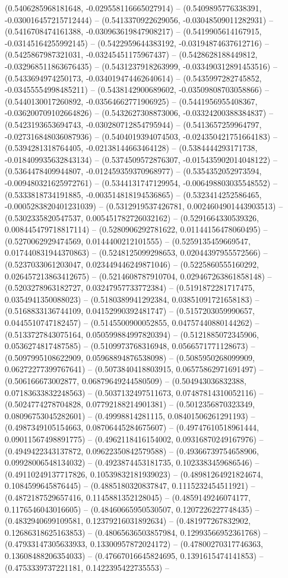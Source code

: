 (0.5406285968181648, -0.029558116665027914) -- (0.5409895776338391, -0.030016457215712444) -- (0.5413370922629056, -0.03048509011282931) -- (0.5416708474161388, -0.030963619847908217) -- (0.5419905614167915, -0.03145164255992145) -- (0.5422959644383192, -0.03194874637612716) -- (0.5425867987321031, -0.03245451175967437) -- (0.5428628188449812, -0.032968511863676435) -- (0.5431237918263999, -0.033490312891453516) -- (0.5433694974250173, -0.034019474462640614) -- (0.5435997282745852, -0.03455554998485211) -- (0.5438142900689602, -0.03509808703058866) -- (0.5440130017260892, -0.03564662771906925) -- (0.5441956955408367, -0.036200709102664826) -- (0.5432627308873006, -0.03324200388384837) -- (0.5423193653694743, -0.030280712854795944) -- (0.5413657259964797, -0.027316848036087936) -- (0.5404019394074503, -0.024350421751664183) -- (0.5394281318764405, -0.02138144663464128) -- (0.5384444293171738, -0.018409935632843134) -- (0.5374509572876307, -0.015435902014048122) -- (0.5364478409944807, -0.012459359370968977) -- (0.5354352052973594, -0.009480321625972761) -- (0.5344131747129954, -0.006498803035548552) -- (0.5333818734191885, -0.003514818194536865) -- (0.5323414252586465, -0.0005283820401231039) -- (0.5312919537426781, 0.0024604901443903513) -- (0.5302335820547537, 0.005451782726032162) -- (0.5291664330539326, 0.008445479718817114) -- (0.5280906292781622, 0.01144156478060495) -- (0.5270062929474569, 0.0144400212101555) -- (0.5259135459669547, 0.017440831944370863) -- (0.5248125099298653, 0.02044397955572566) -- (0.5237033061203047, 0.023449446249871046) -- (0.5225860555160292, 0.026457213863412675) -- (0.5214608787910704, 0.029467263861858148) -- (0.5203278963182727, 0.03247957733772384) -- (0.5191872281717475, 0.0354941350088023) -- (0.5180389941292384, 0.03851091721658183) -- (0.5168833136744109, 0.04152990392481747) -- (0.5157203059990657, 0.0445510747182457) -- (0.5145500900052855, 0.04757440880144262) -- (0.5133727843075164, 0.050599884997820394) -- (0.5121885072345906, 0.0536274817487585) -- (0.5109973768316948, 0.0566571771128673) -- (0.5097995108622909, 0.05968894876538098) -- (0.5085950268099909, 0.06272277399767641) -- (0.5073840418803915, 0.06575862971691497) -- (0.506166673002877, 0.06879649244580509) -- (0.504943036832388, 0.07183633832248563) -- (0.5037132497511673, 0.07487814310052116) -- (0.5024774278704828, 0.07792188214901381) -- (0.5012356870323349, 0.08096753045282601) -- (0.49998814281115, 0.08401506261291193) -- (0.4987349105154663, 0.08706445284675607) -- (0.49747610518961444, 0.09011567498891775) -- (0.4962118416154002, 0.09316870249167976) -- (0.4949422343137872, 0.09622350842579588) -- (0.49366739754658906, 0.09928006548134032) -- (0.4923874453181735, 0.1023383459686546) -- (0.49110249137717826, 0.10539832181939023) -- (0.48981264921824674, 0.1084599645876445) -- (0.4885180320837847, 0.1115232454511921) -- (0.4872187529657416, 0.1145881352128045) -- (0.4859149246074177, 0.1176546043016605) -- (0.48460665950530507, 0.1207226227748435) -- (0.4832940699109581, 0.12379216031892634) -- (0.481977267832902, 0.12686318625163853) -- (0.48065636503857984, 0.12993566952361768) -- (0.47933147305633933, 0.13300957872024172) -- (0.47800270317746363, 0.13608488206354033) -- (0.47667016645824695, 0.1391615474141853) -- (0.4753339737221181, 0.1422395422735553) -- 